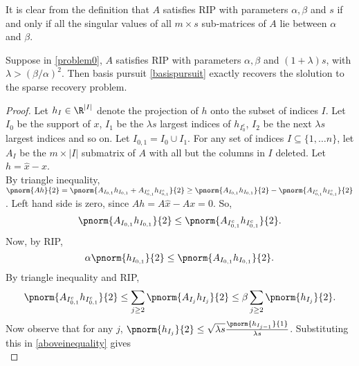 \begin{remark}\label{ripremark}
	It is clear from the definition that $A$ satisfies RIP with
	parameters $\alpha, \beta$ and $s$ if
	and only if all the singular values of all $m\times s$ sub-matrices
	of $A$ lie between $\alpha$ and $\beta$.
\end{remark}

\begin{theorem}\label{ripimpliesexact}
	Suppose in \eqref{problem0}, $A$ satisfies RIP with parameters
	$\alpha, \beta$ and $(1+\lambda)s$, with $\lambda >
	(\beta/\alpha)^2$. Then basis pursuit \eqref{basispursuit}
	exactly recovers the slolution to the sparse recovery problem.
\end{theorem}

\begin{proof}
	Let $h_I\in \R^{|I|}$ denote
	the projection of $h$ onto the subset of indices $I$.
	Let $I_0$ be the support of $x$,
	$I_1$ be the $\lambda s$ largest indices of $h_{I_0^c}$,
	$I_2$ be the next $\lambda s$ largest indices and so on.
	Let $I_{0,1} = I_0 \cup I_1$. For any set of indices
	$I\subseteq \{1,\ldots n\}$, let $A_I$ be the $m\times |I|$
	submatrix of $A$ with all but the columns in $I$ deleted.
	Let $h = \hat{x}-x$.\\
	By triangle inequality,
$	
		\pnorm{Ah}{2} = \pnorm{A_{I_{0,1}}h_{I_{0,1}} + A_{I_{0,1}^c}h_{I_{0,1}^c}}{2}\geq \pnorm{A_{I_{0,1}}h_{I_{0,1}}}{2} - \pnorm{A_{I_{0,1}^c}h_{I_{0,1}^c}}{2}
$.
Left hand side is zero, since $Ah = A\hat{x} - Ax = 0$.
So,
	\begin{equation}\label{cond1}
		\pnorm{A_{I_{0,1}}h_{I_{0,1}}}{2}\leq \pnorm{A_{I_{0,1}^c}h_{I_{0,1}^c}}{2}.
	\end{equation}
Now, by RIP,
	 \begin{equation}\label{cond2}
		 \alpha \pnorm{h_{I_{0,1}}}{2}\leq \pnorm{A_{I_{0,1}}h_{I_{0,1}}}{2}.
	 \end{equation}
By triangle inequality and RIP,
		\begin{equation}\label{aboveinequality}
            \pnorm{A_{I_{0,1}^c}h_{I_{0,1}^c}}{2} 
			\leq  \sum_{j\geq 2} \pnorm{A_{I_j}h_{I_j}}{2}
            \leq \beta\sum_{j\geq 2}\pnorm{h_{I_j}}{2}.
        \end{equation}
Now observe that for any $j$,
        $
		\pnorm{h_{I_j}}{2}\leq \sqrt{\lambda s}\frac{\pnorm{h_{I_{j-1}}}{1}}{{\lambda s}}
        $.
	Substituting this in \eqref{aboveinequality} gives
        \begin{equation}\label{eqpen}

\end{equation}
\end{proof}
